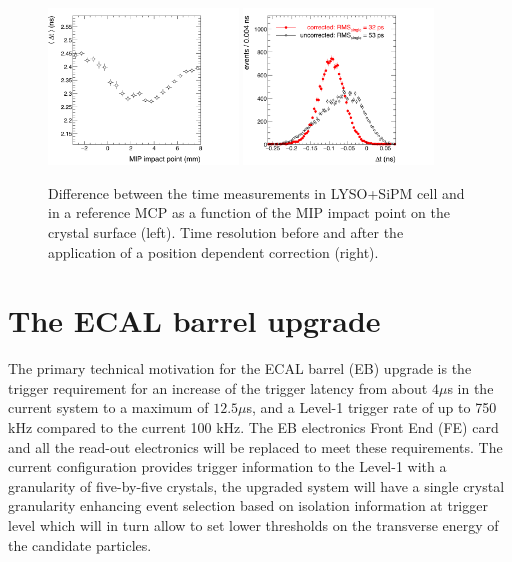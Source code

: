 \begin{figure}[h!]
  \centering
  \includegraphics[width = 0.45\textwidth]{figures/upgrade/c_posProfile.png}
  \includegraphics[width = 0.45\textwidth]{figures/upgrade/c_CTR_posCorr.png}
  \caption{Difference between the time measurements in LYSO+SiPM cell and in a reference MCP
    as a function of the MIP impact point on the crystal surface (left).
    Time resolution before and after the application of a position dependent correction (right).}
  \label{fig:btl_time_res}
\end{figure}

\clearpage
\section{The ECAL barrel upgrade}
The primary technical motivation for the ECAL barrel (EB) upgrade is the trigger requirement for
an increase of the trigger latency from about $4\mu$s in the current system to a maximum of $12.5\mu$s,
and a Level-1 trigger rate of up to 750 kHz compared to the current 100 kHz.
The EB electronics Front End (FE) card and all the read-out electronics will be replaced to
meet these requirements. The current configuration provides trigger information to the Level-1
with a granularity of five-by-five crystals, the upgraded system will have a single crystal granularity
enhancing event selection based on isolation information at trigger level which will in turn allow
to set lower thresholds on the transverse energy of the candidate particles.

